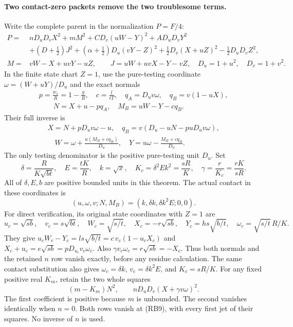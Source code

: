 \paragraph{Two contact-zero packets remove the two troublesome terms.}
Write the complete parent in the normalization $P=F/4$:
\[
\begin{split}
 P={}&nD_uD_vX^2+mM^2+C D_v(uW-Y)^2+A D_uD_vY^2\\
 &+(D+\tfrac12)J^2+(\alpha+\tfrac12)D_u(vY-Z)^2
       +\tfrac12D_v(X+uZ)^2-\tfrac12D_uD_vZ^2,\\
 M={}&vW-X+uvY-uZ,\qquad J=uW+uvX-Y-vZ,
 \quad D_u=1+u^2,\quad D_v=1+v^2.
\end{split}                                                     \tag{RB5}
\]
In the finite state chart $Z=1$, use the pure-testing coordinate
$\omega=(W+uY)/D_u$ and the exact normals
\[
\begin{gathered}
 p=\frac{w_s}{R}=1-\frac gR,\quad c=\frac{l}{tT},\quad
 q_A=D_uv\omega,\quad q_B=v(1-uX),\\
 \qquad N=X+u-pq_A,\quad M_B=uW-Y-cq_B.
\end{gathered}                                    \tag{RB6}
\]
Their full inverse is
\[
\begin{gathered}
 X=N+pD_uv\omega-u,\quad q_B=v(D_u-uN-puD_uv\omega),\\
 \quad W=\omega+\frac{u(M_B+cq_B)}{D_u},\quad
 Y=u\omega-\frac{M_B+cq_B}{D_u}.
\end{gathered}                                    \tag{RB7}
\]
The only testing denominator is the positive pure-testing unit $D_u$.
Set
\[
 \delta=\frac{R}{K\sqrt{bt}},\quad E=\frac{tK}{R},\quad
 k=\sqrt x,\quad K_c=\delta^2Ek^2=\frac{sR}{K},\quad
 \gamma=\frac r{K_c}=\frac{rK}{sR}.                \tag{RB8}
\]
All of $\delta,E,b$ are positive bounded units in this theorem.
The actual contact in these coordinates is
\[
 (u,\omega,v;N,M_B)=(k,\delta k,\delta k^2E;0,0).
 \tag{RB9}
\]
For direct verification, its original state coordinates with $Z=1$ are
\[
 u_c=\sqrt{sb},\quad v_c=s\sqrt{bt},\quad
 W_c=\sqrt{s/t},\quad X_c=-r\sqrt{sb},\quad
 Y_c=hs\sqrt{b/t},\quad
 \omega_c=\sqrt{s/t}\,R/K.
 \tag{RB9a}
\]
They give $u_cW_c-Y_c=ls\sqrt{b/t}=c\,v_c(1-u_cX_c)$
and $X_c+u_c=e\sqrt{sb}=pD_{u_c}v_c\omega_c$.
Also $\gamma v_c\omega_c=r\sqrt{sb}=-X_c$.
Thus both normals and the retained $n$ row vanish exactly, before
any residue calculation. The same contact substitution also gives
$\omega_c=\delta k$, $v_c=\delta k^2E$, and $K_c=sR/K$.
For any fixed positive real $K_m$, retain the two whole squares
\[
 (m-K_m)N^2,
 \qquad nD_uD_v(X+\gamma v\omega)^2.                \tag{RB10}
\]
The first coefficient is positive because $m$ is unbounded. The second
vanishes identically when $n=0$. Both rows vanish at (RB9), with every
first jet of their squares. No inverse of $n$ is used.

